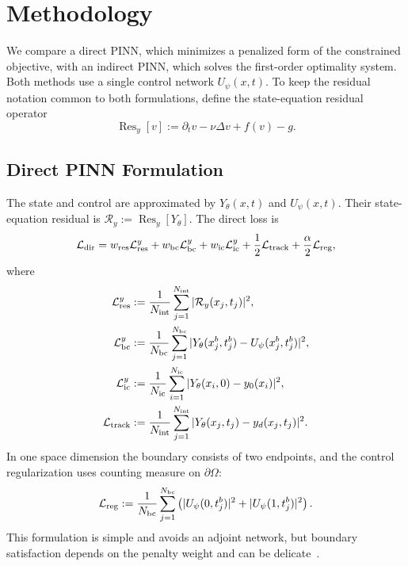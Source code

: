 \section{Methodology}

We compare a direct PINN, which minimizes a penalized form of the constrained objective, with an indirect PINN, which solves the first-order optimality system. Both methods use a single control network $U_\psi(x,t)$. To keep the residual notation common to both formulations, define the state-equation residual operator
\begin{equation}
\operatorname{Res}_y[v]:=\partial_tv-\nu\Delta v+f(v)-g.
\label{eq:state_residual_operator}
\end{equation}

\subsection{Direct PINN Formulation}

The state and control are approximated by $Y_\theta(x,t)$ and $U_\psi(x,t)$. Their state-equation residual is $\mathcal R_y:=\operatorname{Res}_y[Y_\theta]$.
The direct loss is
\begin{equation}
\label{eq:direct_loss}
\mathcal L_{\rm dir}
=w_{\rm res}\mathcal L_{\rm res}^y
+w_{\rm bc}\mathcal L_{\rm bc}^y
+w_{\rm ic}\mathcal L_{\rm ic}^y
+\frac12\mathcal L_{\rm track}
+\frac{\alpha}{2}\mathcal L_{\rm reg},
\end{equation}
where
\begin{align}
\mathcal L_{\rm res}^y&:=\frac1{N_{\rm int}}\sum_{j=1}^{N_{\rm int}}|\mathcal R_y(x_j,t_j)|^2,\\
\mathcal L_{\rm bc}^y&:=\frac1{N_{\rm bc}}\sum_{j=1}^{N_{\rm bc}}|Y_\theta(x_j^b,t_j^b)-U_\psi(x_j^b,t_j^b)|^2,\\
\mathcal L_{\rm ic}^y&:=\frac1{N_{\rm ic}}\sum_{i=1}^{N_{\rm ic}}|Y_\theta(x_i,0)-y_0(x_i)|^2,\\
\mathcal L_{\rm track}&:=\frac1{N_{\rm int}}\sum_{j=1}^{N_{\rm int}}|Y_\theta(x_j,t_j)-y_d(x_j,t_j)|^2.
\end{align}
In one space dimension the boundary consists of two endpoints, and the control regularization uses counting measure on $\partial\Omega$:
\begin{equation}
\mathcal L_{\rm reg}:=\frac1{N_{\rm bc}}\sum_{j=1}^{N_{\rm bc}}
\left(|U_\psi(0,t_j^b)|^2+|U_\psi(1,t_j^b)|^2\right).
\end{equation}
This formulation is simple and avoids an adjoint network, but boundary satisfaction depends on the penalty weight and can be delicate~\cite{zhang2026pinns}.

